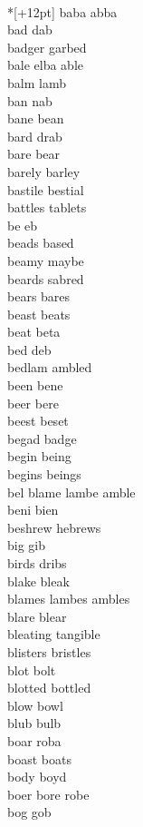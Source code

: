 \vspace{14pt}
\noindent\notextbf{\LargeB}\\*[+12pt]
baba abba\\
bad dab\\
badger garbed\\
bale elba able\\
balm lamb\\
ban nab\\
bane bean\\
bard drab\\
bare bear\\
barely barley\\
bastile bestial\\
battles tablets\\
be eb\\
beads based\\
beamy maybe\\
beards sabred\\
bears bares\\
beast beats\\
beat beta\\
bed deb\\
bedlam ambled\\
been bene\\
beer bere\\
beest beset\\
begad badge\\
begin being\\
begins beings\\
bel blame lambe amble  \\
beni bien\\
beshrew hebrews\\
big gib\\
birds dribs\\
blake bleak\\
blames lambes ambles\\
blare blear\\
bleating tangible\\
blisters bristles\\
blot bolt\\
blotted bottled\\
blow bowl\\
blub bulb\\
boar roba\\
boast boats\\
body boyd\\
boer bore robe\\
bog gob\\
